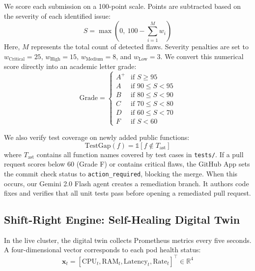 \documentclass[10pt,conference]{IEEEtran}
\begin{document}
We score each submission on a 100-point scale. Points are subtracted based on the severity of each identified issue:
\begin{equation}
S = \max\left(0,\ 100 - \sum_{i=1}^{M} w_i \right)
\label{eq:score}
\end{equation}
Here, $M$ represents the total count of detected flaws. Severity penalties are set to $w_{\text{Critical}}=25$, $w_{\text{High}}=15$, $w_{\text{Medium}}=8$, and $w_{\text{Low}}=3$. We convert this numerical score directly into an academic letter grade:
\begin{equation}
\text{Grade} =
\begin{cases}
A^+ & \text{if } S \geq 95\\
A & \text{if } 90 \leq S < 95\\
B & \text{if } 80 \leq S < 90\\
C & \text{if } 70 \leq S < 80\\
D & \text{if } 60 \leq S < 70\\
F & \text{if } S < 60
\end{cases}
\label{eq:grade}
\end{equation}

We also verify test coverage on newly added public functions:
\begin{equation}
\text{TestGap}(f) = \mathbb{1}[f \notin T_{\text{ast}}]
\label{eq:testgap}
\end{equation}
where $T_{\text{ast}}$ contains all function names covered by test cases in \texttt{tests/}. If a pull request scores below 60 (Grade F) or contains critical flaws, the GitHub App sets the commit check status to \texttt{action\_required}, blocking the merge. When this occurs, our Gemini 2.0 Flash agent creates a remediation branch. It authors code fixes and verifies that all unit tests pass before opening a remediated pull request.

\subsection{Shift-Right Engine: Self-Healing Digital Twin}

In the live cluster, the digital twin collects Prometheus metrics every five seconds. A four-dimensional vector corresponds to each pod health status:
\begin{equation}
\mathbf{x}_t = [\text{CPU}_t, \text{RAM}_t, \text{Latency}_t, \text{Rate}_t]^\top \in \mathbb{R}^4
\label{eq:state}
\end{equation}
\end{document}
